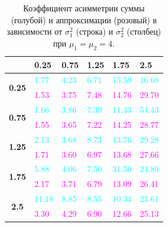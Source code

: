 \documentclass[12pt]{article}
\begin{document}
\begin{table}[!hhh]
	\centering
	\caption{Коэффициент асимметрии суммы (голубой) и аппроксимации (розовый) в зависимости от $\sigma_{1}^{2}$ (строка) и $\sigma_{2}^{2}$ (столбец) при $\mu_{1} = \mu_{2} = 4$.}
	\begin{tabular}{|c|l|l|l|l|l|}
		\hline
		& \textbf{0.25} & \textbf{0.75} & \textbf{1.25} & \textbf{1.75} & \textbf{2.5} \\ \hline
		\multirow{2}{*}{\textbf{0.25}} & \textcolor{cyan}{1.77}          & \textcolor{cyan}{4.23}          & \textcolor{cyan}{6.71}          & \textcolor{cyan}{15.59}         & \textcolor{cyan}{16.68}        \\ \cline{2-6} 
		& \textcolor{magenta}{1.53}          & \textcolor{magenta}{3.75}          & \textcolor{magenta}{7.48}          & \textcolor{magenta}{14.76}         & \textcolor{magenta}{29.70}        \\ \hline
		\multirow{2}{*}{\textbf{0.75}} & \textcolor{cyan}{1.66}          & \textcolor{cyan}{3.86}          & \textcolor{cyan}{7.39}          & \textcolor{cyan}{11.43}         & \textcolor{cyan}{54.43}        \\ \cline{2-6} 
		& \textcolor{magenta}{1.55}          & \textcolor{magenta}{3.65}          & \textcolor{magenta}{7.22}          & \textcolor{magenta}{14.25}         & \textcolor{magenta}{28.77}        \\ \hline
		\multirow{2}{*}{\textbf{1.25}} & \textcolor{cyan}{2.13}          & \textcolor{cyan}{3.68}          & \textcolor{cyan}{8.73}          & \textcolor{cyan}{13.76}         & \textcolor{cyan}{29.28}        \\ \cline{2-6} 
		& \textcolor{magenta}{1.71}          & \textcolor{magenta}{3.60}          & \textcolor{magenta}{6.97}          & \textcolor{magenta}{13.68}         & \textcolor{magenta}{27.66}        \\ \hline
		\multirow{2}{*}{\textbf{1.75}} & \textcolor{cyan}{5.88}          & \textcolor{cyan}{4.06}          & \textcolor{cyan}{7.50}          & \textcolor{cyan}{31.50}         & \textcolor{cyan}{24.89}        \\ \cline{2-6} 
		& \textcolor{magenta}{2.17}          & \textcolor{magenta}{3.71}          & \textcolor{magenta}{6.79}          & \textcolor{magenta}{13.09}         & \textcolor{magenta}{26.41}        \\ \hline
		\multirow{2}{*}{\textbf{2.5}}  & \textcolor{cyan}{11.18}         & \textcolor{cyan}{8.85}          & \textcolor{cyan}{8.55}          & \textcolor{cyan}{10.34}         & \textcolor{cyan}{23.61}        \\ \cline{2-6} 
		& \textcolor{magenta}{3.30}          & \textcolor{magenta}{4.29}          & \textcolor{magenta}{6.90}          & \textcolor{magenta}{12.66}         & \textcolor{magenta}{25.13}        \\ \hline
	\end{tabular}
\end{table}
\end{document}
